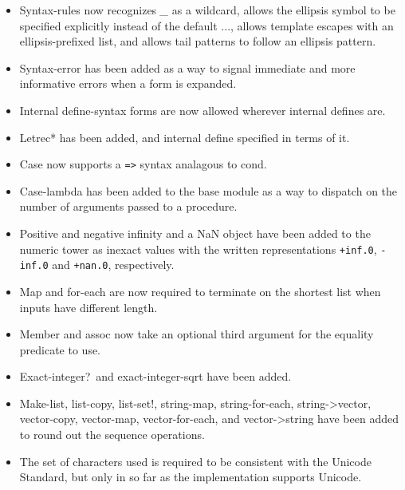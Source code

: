 \begin{itemize}
\item {\cf Syntax-rules} now recognizes {\em \_} as a wildcard, allows
the ellipsis symbol to be specified explicitly instead of the default
{\cf ...}, allows template escapes with an ellipsis-prefixed list, and
allows tail patterns to follow an ellipsis pattern.

\item {\cf Syntax-error} has been added as a way to signal immediate
and more informative errors when a form is expanded.

\item Internal {\cf define-syntax} forms are now allowed wherever
internal {\cf define}s are.

\item {\cf Letrec*} has been added, and internal define specified in
terms of it.

\item {\cf Case} now supports a {\tt =>} syntax analagous to {\cf cond}.

\item {\cf Case-lambda} has been added to the base module as a way to
dispatch on the number of arguments passed to a procedure.

\item Positive and negative infinity and a NaN object have been added
to the numeric tower as inexact values with the written
representations {\tt +inf.0}, {\tt -inf.0} and {\tt +nan.0},
respectively.

\item {\cf Map} and {\cf for-each} are now required to terminate on
the shortest list when inputs have different length.

\item {\cf Member} and {\cf assoc} now take an optional third argument
for the equality predicate to use.

\item {\cf Exact-integer?}\  and {\cf exact-integer-sqrt} have been added.

\item {\cf Make-list}, {\cf list-copy}, {\cf list-set!}, {\cf
string-map}, {\cf string-for-each}, {\cf string->vector}, {\cf
vector-copy}, {\cf vector-map}, {\cf vector-for-each}, and {\cf
vector->string} have been added to round out the sequence operations.

\item The set of characters used is required to be consistent with the
Unicode Standard, but only in so far as the implementation supports
Unicode.


\end{itemize}

